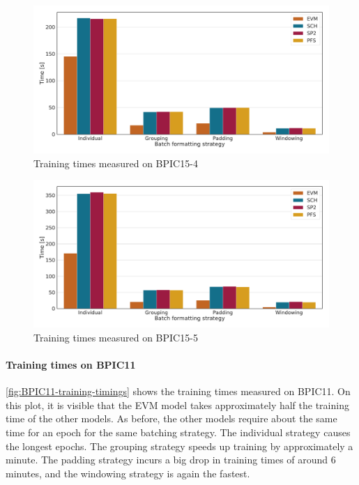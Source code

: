 \begin{figure}[!htb]
    \centering
    \includegraphics[width=\textwidth]{gfx/bpic2015_4/train_timings.pdf}
    \caption{Training times measured on BPIC15-4}
    \label{fig:BPIC15-4-training-timings}
\end{figure}
\begin{figure}[!htb]
    \centering
    \includegraphics[width=\textwidth]{gfx/bpic2015_5/train_timings.pdf}
    \caption{Training times measured on BPIC15-5}
    \label{fig:BPIC15-5-training-timings}
\end{figure}
\FloatBarrier

\paragraph{Training times on BPIC11}
\autoref{fig:BPIC11-training-timings} shows the training times measured on BPIC11.
On this plot, it is visible that the EVM model takes approximately half the training time of the other models.
As before, the other models require about the same time for an epoch for the same batching strategy.
The individual strategy causes the longest epochs.
The grouping strategy speeds up training by approximately a minute.
The padding strategy incurs a big drop in training times of around 6 minutes, and the windowing strategy is again the fastest.

